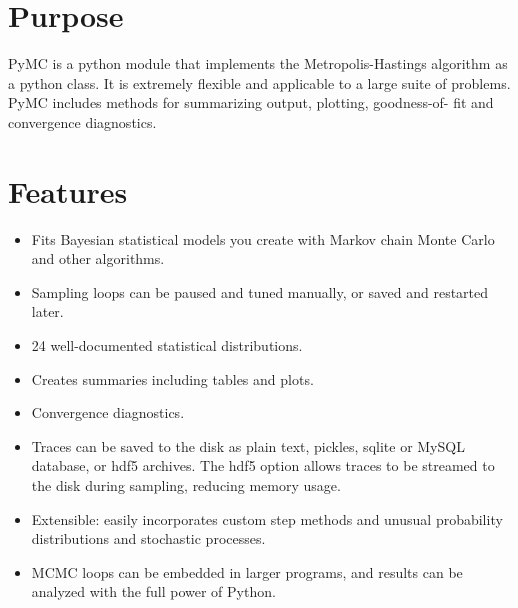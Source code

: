





\hypertarget{purpose}{}
\section*{Purpose}
\label{purpose}

PyMC is a python module that implements the Metropolis-Hastings algorithm as a
python class. It is extremely flexible and applicable to a large suite of
problems. PyMC includes methods for summarizing output, plotting, goodness-of-
fit and convergence diagnostics.



\hypertarget{features}{}
\section*{Features}
\label{features}
\begin{itemize}
\item {} 
Fits Bayesian statistical models you create with Markov chain Monte Carlo and
other algorithms.

\item {} 
Sampling loops can be paused and tuned manually, or saved and restarted later.

\item {} 
24 well-documented statistical distributions.

\item {} 
Creates summaries including tables and plots.

\item {} 
Convergence diagnostics.

\item {} 
Traces can be saved to the disk as plain text, pickles, sqlite or MySQL
database, or hdf5 archives. The hdf5 option allows traces to be streamed
to the disk during sampling, reducing memory usage.

\item {} 
Extensible: easily incorporates custom step methods and unusual probability
distributions and stochastic processes.

\item {} 
MCMC loops can be embedded in larger programs, and results can be analyzed
with the full power of Python.

\end{itemize}


